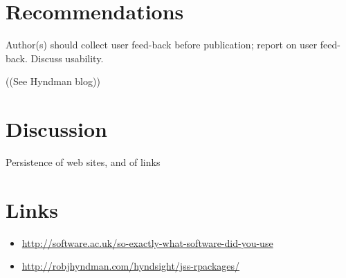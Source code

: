 \documentclass{article}
\begin{document}
\section{Recommendations}
Author(s) should collect user feed-back before publication; report
on user feed-back. Discuss usability.

((See Hyndman blog))

\section{Discussion}
Persistence of web sites, and of links

\section{Links}

\begin{itemize}
\item \url{http://software.ac.uk/so-exactly-what-software-did-you-use}
\item \url{http://robjhyndman.com/hyndsight/jss-rpackages/}
\end{itemize}
\end{document}
